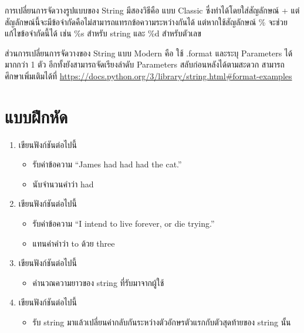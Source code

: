 การเปลี่ยนการจัดวางรูปแบบของ String มีสองวิธีคือ แบบ Classic ซึ่งทำได้โดยใส่สัญลักษณ์ + แต่สัญลักษณ์นี้จะมีข้อจำกัดคือไม่สามารถแทรกข้อความระหว่างกันได้ แต่หากใช้สัญลักษณ์ \% จะช่วยแก้ไขข้อจำกัดนี้ได้ เช่น \%s สำหรับ string และ \%d สำหรับตัวเลข 

ส่วนการเปลี่ยนการจัดวางของ String แบบ Modern คือ ใช้ .format และระบุ Parameters ได้มากกว่า 1 ตัว อีกทั้งยังสามารถจัดเรียงลำดับ Parameters สลับก่อนหลังได้ตามสะดวก สามารถศึกษาเพิ่มเติมได้ที่ \url{https://docs.python.org/3/library/string.html#format-examples}

\section{แบบฝึกหัด}
\begin{enumerate} 
\item 	เขียนฟังก์ชันต่อไปนี้
\begin{itemize}
\item 	รับค่าข้อความ “James had had had the cat.”
\item 	นับจำนวนคำว่า had
\end{itemize}
\item 	เขียนฟังก์ชันต่อไปนี้
\begin{itemize}
\item 	รับค่าข้อความ “I intend to live forever, or die trying.”
\item 	แทนค่าคำว่า to ด้วย three
\end{itemize}
\item 	เขียนฟังก์ชันต่อไปนี้
\begin{itemize}
\item 	คำนวณความยาวของ string ที่รับมาจากผู้ใช้
\end{itemize}
\item 	เขียนฟังก์ชันต่อไปนี้
\begin{itemize}
\item 	รับ string มาแล้วเปลี่ยนค่ากลับกันระหว่างตัวอักษรตัวแรกกับตัวสุดท้ายของ string นั้น
\end{itemize}
\end{enumerate}


